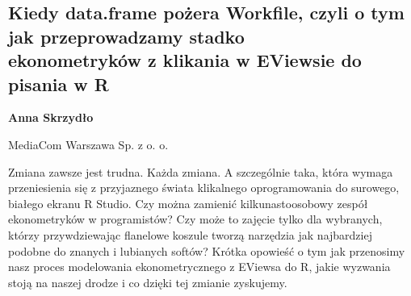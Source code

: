 \documentclass[\main/boa.tex]{subfiles}
\begin{document}
\subsection[Kiedy data.frame pożera Workfile, czyli o tym jak przeprowadzamy stadko \\ ekonometryków z klikania w EViewsie do pisania w R]{Kiedy data.frame pożera Workfile, czyli o tym jak przeprowadzamy stadko \\ ekonometryków z klikania w EViewsie do pisania w R}

\begin{minipage}{0.915\textwidth}
	\centering
  {\bf {} Anna Skrzydło}
\end{minipage}


\begin{affiliations}
\begin{minipage}{0.915\textwidth}
\centering
MediaCom Warszawa Sp. z o. o. \\[-2pt]
\end{minipage}
\end{affiliations}

\vskip 0.3cm

Zmiana zawsze jest trudna. Każda zmiana. A szczególnie taka, która wymaga przeniesienia się z przyjaznego świata klikalnego oprogramowania do surowego, białego ekranu R Studio. Czy można zamienić kilkunastoosobowy zespół ekonometryków w programistów? Czy może to zajęcie tylko dla wybranych, którzy przywdziewając flanelowe koszule tworzą narzędzia jak najbardziej podobne do znanych i lubianych softów? Krótka opowieść o tym jak przenosimy nasz proces modelowania ekonometrycznego z EViewsa do R, jakie wyzwania stoją na naszej drodze i co dzięki tej zmianie zyskujemy. 
\end{document}
